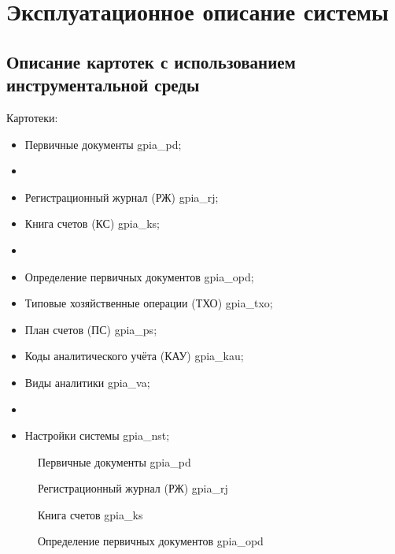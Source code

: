 \section{Эксплуатационное описание системы}

\subsection{Описание картотек с использованием инструментальной среды}

Картотеки:

\begin{itemize}
    \item Первичные документы gpia\_pd;
    \item[] \hspace{0pt}
    \item Регистрационный журнал (РЖ) gpia\_rj;
    \item Книга счетов (КС) gpia\_ks;
    \item[] \hspace{0pt}
    \item Определение первичных документов gpia\_opd;
    \item Типовые хозяйственные операции (ТХО) gpia\_txo;
    \item План счетов (ПС) gpia\_ps;
    \item Коды аналитического учёта (КАУ) gpia\_kau;
    \item Виды аналитики gpia\_va;
    \item[] \hspace{0pt}
    \item Настройки системы gpia\_nst;
\end{itemize}

\begin{figure}[!htb]
    \centering
    \caption{Первичные документы gpia\_pd}
    \label{fig:gpia_pd}
\end{figure}

\begin{figure}[!htb]
    \centering
    \caption{Регистрационный журнал (РЖ) gpia\_rj}
    \label{fig:gpia_rj}
\end{figure}

\begin{figure}[!htb]
    \centering
    \caption{Книга счетов gpia\_ks}
    \label{fig:gpia_ks}
\end{figure}

\begin{figure}[!htb]
    \centering
    \caption{Определение первичных документов gpia\_opd}
    \label{fig:gpia_opd}
\end{figure}

